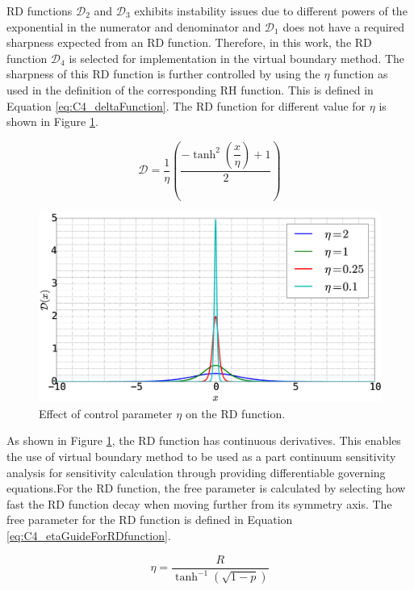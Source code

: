 RD functions $\mathcal{D}_2$ and $\mathcal{D}_3$ exhibits instability issues due to different powers of the exponential in the numerator and denominator and $\mathcal{D}_1$ does not have a required sharpness expected from an RD function. Therefore, in this work, the RD function $\mathcal{D}_4$ is selected for implementation in the virtual boundary method. The sharpness of this RD function is further controlled by using the $\eta$ function as used in the definition of the corresponding RH function. This is defined in Equation \eqref{eq:C4_deltaFunction}. The RD function for different value for $\eta$ is shown in Figure \ref{fig:C4_deltaFunctionWithControlParamter}.

\begin{equation}\label{eq:C4_deltaFunction}
    \mathcal{D} = \dfrac{1}{\eta} \left( \dfrac{-\tanh^{2}{\left (\dfrac{x}{\eta} \right )} + 1}{2} \right)
\end{equation}

\begin{figure}[H]
    \centering
    \includegraphics[width=12.00cm]{Chapter_4/figure/delta_function_with_control.eps}
    \caption{Effect of control parameter $\eta$ on the RD function.}
    \label{fig:C4_deltaFunctionWithControlParamter}
\end{figure}

As shown in Figure \ref{fig:C4_deltaFunctionWithControlParamter}, the RD function has continuous derivatives. This enables the use of virtual boundary method to be used as a part continuum sensitivity analysis for sensitivity calculation through providing differentiable governing equations.For the RD function, the free parameter is calculated by selecting how fast the RD function decay when moving further from its symmetry axis. The free parameter for the RD function is defined in Equation \eqref{eq:C4_etaGuideForRDfunction}.

\begin{equation}\label{eq:C4_etaGuideForRDfunction}
    \eta = \frac{R}{\tanh^{-1} (\sqrt{1 - p})}
\end{equation}

